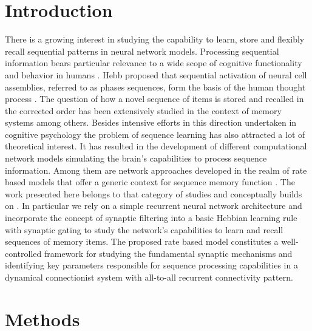 \documentclass[a4paper]{esannV2}
\begin{document}
\section{Introduction}
There is a growing interest in studying the capability to learn, store and flexibly recall sequential patterns in neural network models. Processing sequential information bears particular relevance to a wide scope of cognitive functionality and behavior in humans \cite{lashley1951problem}. Hebb proposed that sequential activation of neural cell assemblies, referred to as phases sequences, form the basis of the human thought process \cite{hebb2005organization}. The question of how a novel sequence of items is stored and recalled in the corrected order has been extensively studied in the context of memory systems among others. Besides intensive efforts in this direction undertaken in cognitive psychology \cite{hurlstone2014memory} the problem of sequence learning has also attracted a lot of theoretical interest. It has resulted in the development of different computational network models simulating the brain's capabilities to process sequence information. Among them are network approaches developed in the realm of rate based models that offer a generic context for sequence memory function \cite{amari1972learning}\cite{kohonen1977principle}\cite{sandberg2002bayesian}. The work presented here belongs to that category of studies and conceptually builds on \cite{sandberg2002bayesian}. In particular we rely on a simple recurrent neural network architecture and incorporate the concept of synaptic filtering into a basic Hebbian learning rule with synaptic gating \cite{andrew2003spiking} to study the network's capabilities to learn and recall sequences of memory items. The proposed rate based model constitutes a well-controlled framework for studying the fundamental synaptic mechanisms and identifying key parameters responsible for sequence processing capabilities in a dynamical connectionist system with all-to-all recurrent connectivity pattern. 
%

\section{Methods}
\end{document}

